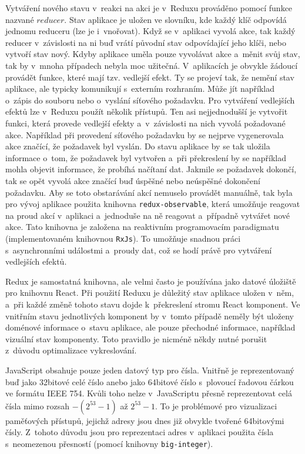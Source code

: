 Vytváření nového stavu v~reakci na akci je v~Reduxu prováděno pomocí funkce nazvané $reducer$. Stav aplikace je uložen ve slovníku, kde každý klíč odpovídá jednomu reduceru (lze je i~vnořovat). Když se v~aplikaci vyvolá akce, tak každý reducer v~závislosti na ni buď vrátí původní stav odpovídající jeho klíči, nebo vytvoří stav nový.
Kdyby aplikace uměla pouze vyvolávat akce a~měnit svůj stav, tak by v~mnoha případech nebyla moc užitečná. V~aplikacích je obvykle žádoucí provádět funkce, které mají tzv. vedlejší efekt. Ty se projeví tak, že nemění stav aplikace, ale typicky komunikují s~externím rozhraním. Může jít například o~zápis do souboru nebo o~vyslání síťového požadavku. Pro vytváření vedlejších efektů lze v~Reduxu použít několik \mbox{přístupů}. Ten asi nejjednodušší je vytvořit funkci, která provede vedlejší efekty a~v~závislosti na nich vyvolá požadované akce. Například při provedení síťového požadavku by se nejprve vygenerovala akce značící, že požadavek byl vyslán. Do stavu aplikace by se tak uložila informace o~tom, že požadavek byl vytvořen a~při překreslení by se například mohla objevit informace, že probíhá načítaní dat. Jakmile se požadavek dokončí, tak se opět vyvolá akce značící buď úspěšné nebo neúspěšné dokončení požadavku. Aby se toto obstarávání akcí nemuselo provádět manuálně, tak byla pro vývoj aplikace použita knihovna \texttt{redux-observable}, která umožňuje reagovat na proud akcí v~aplikaci a~jednoduše na ně reagovat a~případně vytvářet nové akce. Tato knihovna je založena na reaktivním programovacím paradigmatu (implementovaném knihovnou \texttt{RxJs}). To umožňuje snadnou práci s~asynchronními událostmi a~proudy dat, což se hodí právě pro vytváření vedlejších efektů.

Redux je samostatná knihovna, ale velmi často je používána jako datové úložiště pro knihovnu React. Při použití Reduxu je důležitý stav aplikace uložen v~něm, a~při každé změně tohoto stavu dojde k~překreslení stromu React komponent. Ve vnitřním stavu jednotlivých komponent by v~tomto případě neměly být uloženy doménové informace o~stavu aplikace, ale pouze přechodné informace, například vizuální stav komponenty. Toto pravidlo je nicméně někdy nutné porušit z~důvodu optimalizace vykreslování.

JavaScript obsahuje pouze jeden datový typ pro čísla. Vnitřně je reprezentovaný buď jako 32bitové celé číslo anebo jako 64bitové číslo s~plovoucí řadovou čárkou ve formátu IEEE 754. Kvůli toho nelze v~JavaScriptu přesně reprezentovat celá čísla mimo rozsah $-(2^{53} - 1)$ až $2^{53} - 1$. To je problémové pro vizualizaci paměťových přístupů, jejichž adresy jsou dnes již obvykle tvořené 64bitovými čísly. Z~tohoto důvodu jsou pro reprezentaci adres v~aplikaci použita čísla s~neomezenou přesností (pomocí knihovny \texttt{big-integer}).

